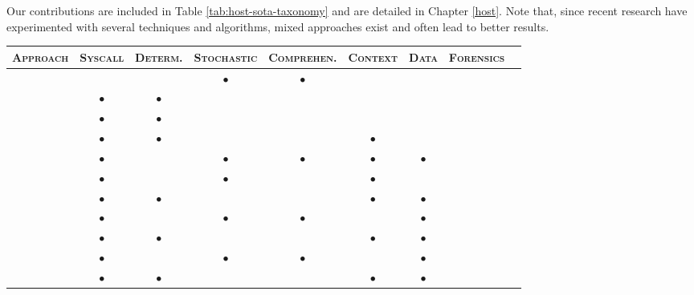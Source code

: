 Our contributions are included in Table \ref{tab:host-sota-taxonomy}
and are detailed in Chapter \ref{host}. Note that, since recent
research have experimented with several techniques and algorithms,
mixed approaches exist and often lead to better results.

\begin{table}
  \renewcommand{\arraystretch}{1.3}
  \centering\footnotesize
  \begin{tabular}{rcccccccc}
    \toprule \textsc{Approach} & \textsc{Syscall} & \textsc{Determ.} &
    \textsc{Stochastic} & \textsc{Comprehen.} & \textsc{Context} &
    \textsc{Data} & \textsc{Forensics} \\

    \midrule

    \citep{lee:2000:framework} & & & $\bullet$ & $\bullet$ & & & \\

    \citep{sekar:sp2001:automaton} & $\bullet$ & $\bullet$ & & & & &
    \\

    \citep{wagner:sp2001:staticanalysis} & $\bullet$ & $\bullet$ &
    & & & & \\

    \citep{rulessystemcallarguments} & $\bullet$ &
    $\bullet$ & & & $\bullet$ & & \\

    \citep{libanomaly} & $\bullet$ &
    & $\bullet$ & $\bullet$ & $\bullet$ & $\bullet$ & \\

    \citep{zanero-ethology} & $\bullet$ & & $\bullet$ & & $\bullet$ &
    & \\

    \citep{giffin} & $\bullet$ & $\bullet$ & & & $\bullet$ &
    $\bullet$ & \\

    \citep{mutz06:syscalls} & $\bullet$ & & $\bullet$ &
    $\bullet$ & & $\bullet$ & \\

    \citep{venkat_dataflow} & $\bullet$ &
    $\bullet$ & & & $\bullet$ & $\bullet$ & \\

    \citep{mutz:raid2007:syscalls} & $\bullet$ & & $\bullet$ &
    $\bullet$ & & $\bullet$ & \\

    \citep{1352621} &
    $\bullet$ & $\bullet$ & & & $\bullet$ & $\bullet$ & \\


\end{tabular}
\end{table}
